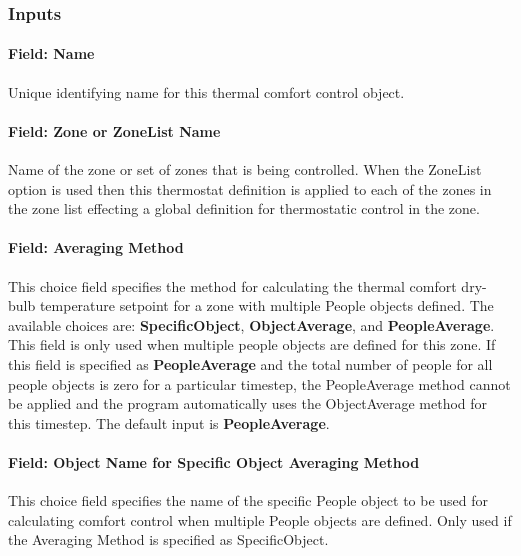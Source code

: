 \subsubsection{Inputs}\label{inputs-9-025}

\paragraph{Field: Name}\label{field-name-7-024}

Unique identifying name for this thermal comfort control object.

\paragraph{Field: Zone or ZoneList Name}\label{field-zone-or-zonelist-name-2-000}

Name of the zone or set of zones that is being controlled. When the ZoneList option is used then this thermostat definition is applied to each of the zones in the zone list effecting a global definition for thermostatic control in the zone.

\paragraph{Field: Averaging Method}\label{field-averaging-method}

This choice field specifies the method for calculating the thermal comfort dry-bulb temperature setpoint for a zone with multiple People objects defined. The available choices are: \textbf{SpecificObject}, \textbf{ObjectAverage}, and \textbf{PeopleAverage}. This field is only used when multiple people objects are defined for this zone. If this field is specified as \textbf{PeopleAverage} and the total number of people for all people objects is zero for a particular timestep, the PeopleAverage method cannot be applied and the program automatically uses the ObjectAverage method for this timestep. The default input is \textbf{PeopleAverage}.

\paragraph{Field: Object Name for Specific Object Averaging Method}\label{field-object-name-for-specific-object-averaging-method}

This choice field specifies the name of the specific People object to be used for calculating comfort control when multiple People objects are defined. Only used if the Averaging Method is specified as SpecificObject.

